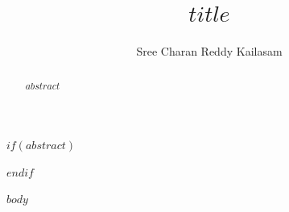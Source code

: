 \documentclass[manuscript,screen,nonacm]{acmart}
\title[Memglide: Bounded Repository Context]{$title$}
\author{Sree Charan Reddy Kailasam}
\begin{document}
$if(abstract)$
\begin{abstract}
$abstract$
\end{abstract}
$endif$
\maketitle
$body$


\end{document}
